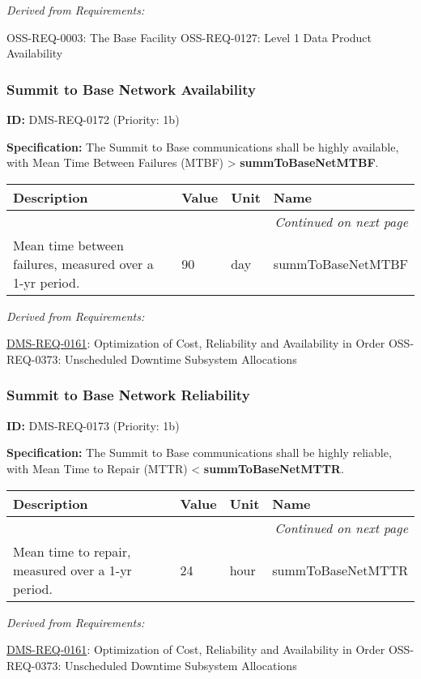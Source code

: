 \documentclass[SE,toc,lsstdraft]{lsstdoc}
\makeatletter
\newcommand{\paramname}[1]{\hspace{0pt}#1}
\newcommand{\unitname}[1]{\hspace{0pt}#1}
\newenvironment{parameters}[0]{%
\setlength\LTleft{0pt}
\setlength\LTright{\fill}
\begin{small}
\begin{longtable}[]{|p{0.49\textwidth}|l|p{0.6in}|p{1.70in}@{}|}

\hline \textbf{Description} & \textbf{Value} & \textbf{Unit} & \textbf{Name} \\ \hline
\endhead

\hline \multicolumn{4}{r}{\emph{Continued on next page}} \\
\endfoot

\hline\hline
\endlastfoot
}{%
\hline
\end{longtable}
\end{small}
}
\makeatother
\begin{document}
\emph{Derived from Requirements:}

OSS-REQ-0003:
The Base Facility \newline
OSS-REQ-0127:
Level 1 Data Product Availability \newline

\subsubsection{Summit to Base Network Availability}

\label{DMS-REQ-0172}
\textbf{ID:} DMS-REQ-0172 (Priority: 1b)

\textbf{Specification:} The Summit to Base communications shall be highly available, with Mean Time Between Failures (MTBF) > \textbf{summToBaseNetMTBF}.

\begin{parameters}
Mean time between failures, measured over a 1-yr period.
&
90
&
\unitname{%
day
}
&
\paramname{%
summToBaseNetMTBF
} \\\hline
\end{parameters}

\emph{Derived from Requirements:}

\hyperref[DMS-REQ-0161]{DMS-REQ-0161}:
Optimization of Cost, Reliability and Availability in Order \newline
OSS-REQ-0373:
Unscheduled Downtime Subsystem Allocations \newline

\subsubsection{Summit to Base Network Reliability}

\label{DMS-REQ-0173}
\textbf{ID:} DMS-REQ-0173 (Priority: 1b)

\textbf{Specification:} The Summit to Base communications shall be highly reliable, with Mean Time to Repair (MTTR) < \textbf{summToBaseNetMTTR}.

\begin{parameters}
Mean time to repair, measured over a 1-yr period.
&
24
&
\unitname{%
hour
}
&
\paramname{%
summToBaseNetMTTR
} \\\hline
\end{parameters}

\emph{Derived from Requirements:}

\hyperref[DMS-REQ-0161]{DMS-REQ-0161}:
Optimization of Cost, Reliability and Availability in Order \newline
OSS-REQ-0373:
Unscheduled Downtime Subsystem Allocations \newline
\end{document}
